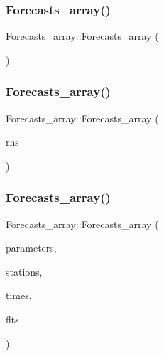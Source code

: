 \subsubsection{\texorpdfstring{Forecasts\+\_\+array()}{Forecasts\_array()}\hspace{0.1cm}{\footnotesize\ttfamily [1/4]}}
{\footnotesize\ttfamily Forecasts\+\_\+array\+::\+Forecasts\+\_\+array (\begin{DoxyParamCaption}{ }\end{DoxyParamCaption})}

\mbox{\label{class_forecasts__array_a46a39594c6bc4f9b08ef3ff752147695}} 
\subsubsection{\texorpdfstring{Forecasts\+\_\+array()}{Forecasts\_array()}\hspace{0.1cm}{\footnotesize\ttfamily [2/4]}}
{\footnotesize\ttfamily Forecasts\+\_\+array\+::\+Forecasts\+\_\+array (\begin{DoxyParamCaption}\item[{const \mbox{\hyperlink{class_forecasts__array}{Forecasts\+\_\+array}} \&}]{rhs }\end{DoxyParamCaption})\hspace{0.3cm}{\ttfamily [delete]}}

\mbox{\label{class_forecasts__array_a7102efd52c1ed471ac9d05960e73e4a0}} 
\subsubsection{\texorpdfstring{Forecasts\+\_\+array()}{Forecasts\_array()}\hspace{0.1cm}{\footnotesize\ttfamily [3/4]}}
{\footnotesize\ttfamily Forecasts\+\_\+array\+::\+Forecasts\+\_\+array (\begin{DoxyParamCaption}\item[{\mbox{\hyperlink{classanen_par_1_1_parameters}{anen\+Par\+::\+Parameters}}}]{parameters,  }\item[{\mbox{\hyperlink{classanen_sta_1_1_stations}{anen\+Sta\+::\+Stations}}}]{stations,  }\item[{\mbox{\hyperlink{classanen_time_1_1_times}{anen\+Time\+::\+Times}}}]{times,  }\item[{\mbox{\hyperlink{classanen_time_1_1_f_l_ts}{anen\+Time\+::\+F\+L\+Ts}}}]{flts }\end{DoxyParamCaption})}

